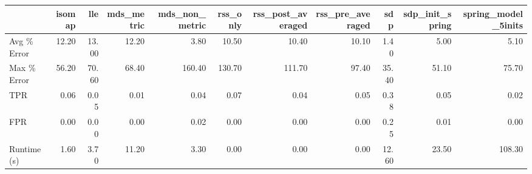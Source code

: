 \documentclass[preview]{standalone}
\begin{document}
    \begin{tabular}{lrrrrrrrrrr}
\toprule
{} &  isomap &    lle &  mds\_metric &  mds\_non\_metric &  rss\_only &  rss\_post\_averaged &  rss\_pre\_averaged &    sdp &  sdp\_init\_spring &  spring\_model\_5inits \\
\midrule
Avg \% Error &   12.20 &  13.00 &       12.20 &            3.80 &     10.50 &              10.40 &             10.10 &   1.40 &             5.00 &                 5.10 \\
Max \% Error &   56.20 &  70.60 &       68.40 &          160.40 &    130.70 &             111.70 &             97.40 &  35.40 &            51.10 &                75.70 \\
TPR         &    0.06 &   0.05 &        0.01 &            0.04 &      0.07 &               0.04 &              0.05 &   0.38 &             0.05 &                 0.02 \\
FPR         &    0.00 &   0.00 &        0.00 &            0.02 &      0.00 &               0.00 &              0.00 &   0.25 &             0.01 &                 0.00 \\
Runtime (s) &    1.60 &   3.70 &       11.20 &            3.30 &      0.00 &               0.00 &              0.00 &  12.60 &            23.50 &               108.30 \\
\bottomrule
\end{tabular}

    
\end{document}
